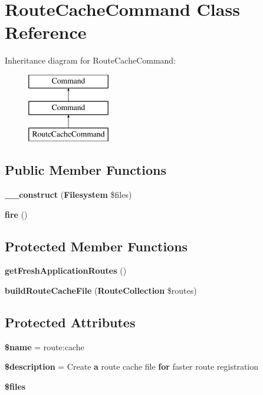 \section{Route\+Cache\+Command Class Reference}
\label{class_illuminate_1_1_foundation_1_1_console_1_1_route_cache_command}
Inheritance diagram for Route\+Cache\+Command\+:\begin{figure}[H]
\begin{center}
\leavevmode
\includegraphics[height=3.000000cm]{class_illuminate_1_1_foundation_1_1_console_1_1_route_cache_command}
\end{center}
\end{figure}
\subsection*{Public Member Functions}
\begin{DoxyCompactItemize}
\item 
{\bf \+\_\+\+\_\+construct} ({\bf Filesystem} \$files)
\item 
{\bf fire} ()
\end{DoxyCompactItemize}
\subsection*{Protected Member Functions}
\begin{DoxyCompactItemize}
\item 
{\bf get\+Fresh\+Application\+Routes} ()
\item 
{\bf build\+Route\+Cache\+File} ({\bf Route\+Collection} \$routes)
\end{DoxyCompactItemize}
\subsection*{Protected Attributes}
\begin{DoxyCompactItemize}
\item 
{\bf \$name} = \textquotesingle{}route\+:cache\textquotesingle{}
\item 
{\bf \$description} = \textquotesingle{}Create {\bf a} route cache file {\bf for} faster route registration\textquotesingle{}
\item 
{\bf \$files}
\end{DoxyCompactItemize}


